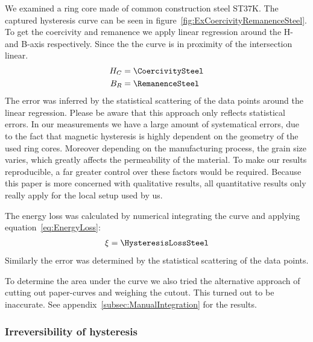 \documentclass[a4paper,10pt,twocolumn]{article}
\begin{document}
    We examined a ring core made of common construction steel ST37K\@.
    The captured hysteresis curve can be seen in figure~\ref{fig:ExCoercivityRemanenceSteel}.
    To get the coercivity and remanence we apply linear regression around the H- and B-axis respectively.
    Since the the curve is in proximity of the intersection linear.
    \begin{align*}
        H_C &= \CoercivitySteel \\
        B_R &= \RemanenceSteel
    \end{align*}
    The error was inferred by the statistical scattering of the data points around the linear regression.
    Please be aware that this approach only reflects statistical errors.
    In our measurements we have a large amount of systematical errors, due to the fact that magnetic hysteresis is
    highly dependent on the geometry of the used ring cores. 
    Moreover depending on the manufacturing process, the grain size varies, which greatly affects the permeability of
    the material.
    To make our results reproducible, a far greater control over these factors would be required.
    Because this paper is more concerned with qualitative results, all quantitative results only really apply for the
    local setup used by us.
    
    The energy loss was calculated by numerical integrating the curve and applying equation~\eqref{eq:EnergyLoss}:
    \begin{align*}
        \xi = \HysteresisLossSteel
    \end{align*}
    Similarly the error was determined by the statistical scattering of the data points.
    
    To determine the area under the curve we also tried the alternative approach of cutting out paper-curves and
    weighing the cutout.
    This turned out to be inaccurate.
    See appendix~\ref{subsec:ManualIntegration} for the results.
    
    \subsubsection*{Irreversibility of hysteresis}
    
    
\end{document}
